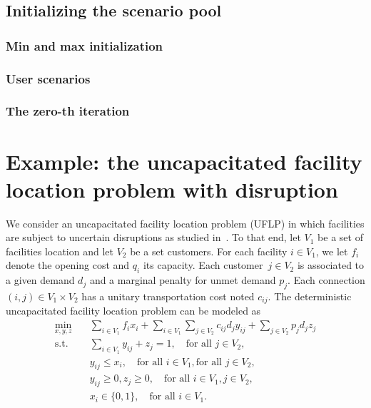 \subsection{Initializing the scenario pool}
\label{sec:ccg:initial-scenario}

\subsubsection{Min and max initialization}


\subsubsection{User scenarios}


\subsubsection{The zero-th iteration}


\section[Example: the UFLP with disruption]{Example: the uncapacitated facility location problem with disruption}
\label{sec:ccg:twp-stage-uflp}

We consider an uncapacitated facility location problem (UFLP) in which
facilities are subject to uncertain disruptions as studied
in~\textcite{Cheng2021}. To that end, let $V_1$ be a set of facilities
location and let $V_2$ be a set customers. For each facility $i\in V_1$, we
let $f_i$ denote the opening cost and $q_i$ its capacity. Each customer~$j\in
V_2$ is associated to a given demand $d_j$ and a marginal penalty for unmet
demand $p_j$. Each connection $(i,j)\in V_1\times V_2$ has a unitary
transportation cost noted $c_{ij}$. The deterministic uncapacitated facility
location problem can be modeled as 
%
\begin{subequations}
    \label{eq:ccg:uflp}
    \begin{align}
        \min_{x,y,z} \quad & \sum_{i\in V_1} f_ix_i + \sum_{i\in V_1} \sum_{j\in V_2} c_{ij} d_j y_{ij} + \sum_{j\in V_2} p_jd_jz_j \\
        \text{s.t.} \quad & \sum_{i\in V_1} y_{ij} + z_j = 1, \quad \text{for all } j\in V_2, \label{eq:ccg:uflp:assignment} \\
        & y_{ij} \le x_i, \quad \text{for all } i\in V_1, \text{for all } j\in V_2,  \label{eq:ccg:uflp:activation} \\
        & y_{ij}\ge 0, z_j \ge 0, \quad \text{for all } i\in V_1, j\in V_2, \label{eq:ccg:uflp:non-negative} \\
        & x_i\in\{0,1\}, \quad \text{for all } i\in V_1.
    \end{align}
\end{subequations}

